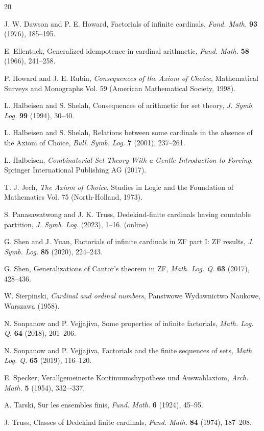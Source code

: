 \documentclass[a4paper,engthesis,master]{chula-memoir}
\theoremstyle{definition}
\begin{document}
\begin{thebibliography}{20}

\normalem

J. W. Dawson and P. E. Howard, Factorials of infinite cardinals, \emph{Fund. Math.} \textbf{93} (1976), 185--195.

E. Ellentuck, Generalized idempotence in cardinal arithmetic, \emph{Fund. Math.} \textbf{58} (1966), 241--258.

P. Howard and J. E. Rubin, \emph{Consequences of the Axiom of Choice}, Mathematical Surveys and Monographs Vol. 59 (American Mathematical Society, 1998).

L. Halbeisen and S. Shelah, Consequences of arithmetic for set theory, \emph{J. Symb. Log.} \textbf{99} (1994), 30--40.

L. Halbeisen and S. Shelah, Relations between some cardinals in the absence of the Axiom of Choice, \emph{Bull. Symb. Log.} \textbf{7} (2001), 237--261.

L. Halbeisen, \emph{Combinatorial Set Theory With a Gentle Introduction to Forcing}, Springer International Publishing AG (2017).

T. J. Jech, \emph{The Axiom of Choice}, Studies in Logic and the Foundation of Mathematics Vol. 75 (North-Holland, 1973).

S. Panasawatwong and J. K. Truss, Dedekind-finite cardinals having countable partition, \emph{J. Symb. Log.} (2023), 1--16. (online)

G. Shen and J. Yuan, Factorials of infinite cardinals in ZF part I: ZF results, \emph{J. Symb. Log.} \textbf{85} (2020), 224--243.

G. Shen, Generalizations of Cantor's theorem in ZF, \emph{Math. Log. Q.} \textbf{63} (2017), 428--436.

W. Sierpinski, \emph{Cardinal and ordinal numbers}, Panstwowe Wydawnictwo Naukowe, Warszawa (1958).

N. Sonpanow and P. Vejjajiva, Some properties of infinite factorials, \emph{Math. Log. Q.} \textbf{64} (2018), 201--206.

N. Sonpanow and P. Vejjajiva, Factorials and the finite sequences of sets, \emph{Math. Log. Q.} \textbf{65} (2019), 116--120.

E. Specker, Verallgemeinerte Kontinuumshypothese und Auswahlaxiom, \emph{Arch. Math.} \textbf{5} (1954), 332–-337.

A. Tarski, Sur les ensembles finis, \emph{Fund. Math.} \textbf{6} (1924), 45--95.

J. Truss, Classes of Dedekind finite cardinals, \emph{Fund. Math.} \textbf{84} (1974), 187--208.

\end{thebibliography}



\end{document}
